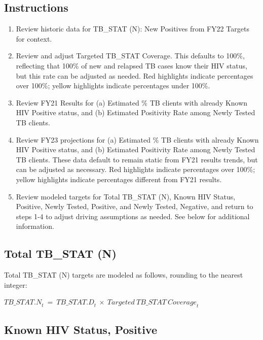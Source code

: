 \documentclass[
  openany]{book}
\begin{document}
\hypertarget{instructions-25}{%
\subsection{Instructions}\label{instructions-25}}

\begin{enumerate}
\def\labelenumi{\arabic{enumi}.}
\item
  Review historic data for TB\_STAT (N): New Positives from FY22
  Targets for context.
\item
  Review and adjust Targeted TB\_STAT Coverage. This defaults to 100\%,
  reflecting that 100\% of new and relapsed TB cases know their HIV
  status, but this rate can be adjusted as needed. Red highlights
  indicate percentages over 100\%; yellow highlights indicate
  percentages under 100\%.
\item
  Review FY21 Results for (a) Estimated \% TB clients with already
  Known HIV Positive status, and (b) Estimated Positivity Rate among
  Newly Tested TB clients.
\item
  Review FY23 projections for (a) Estimated \% TB clients with already
  Known HIV Positive status, and (b) Estimated Positivity Rate among
  Newly Tested TB clients. These data default to remain static from
  FY21 results trends, but can be adjusted as necessary. Red
  highlights indicate percentages over 100\%; yellow highlights
  indicate percentages different from FY21 results.
\item
  Review modeled targets for Total TB\_STAT (N), Known HIV Status,
  Positive, Newly Tested, Positive, and Newly Tested, Negative, and
  return to steps 1-4 to adjust driving assumptions as needed. See
  below for additional information.
\end{enumerate}

\hypertarget{total-tb_stat-n}{%
\subsection{Total TB\_STAT (N)}\label{total-tb_stat-n}}

Total TB\_STAT (N) targets are modeled as follows, rounding to the
nearest integer:

\begin{center} ${TB\_ STAT.N}_{t}\  = \ {TB\_ STAT.D}_{t}\  \times \ {Targeted\ TB\_ STAT\ Coverage}_{t}$ \end{center}

\hypertarget{known-hiv-status-positive}{%
\subsection{Known HIV Status, Positive}\label{known-hiv-status-positive}}
\end{document}
